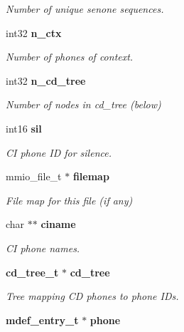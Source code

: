 \begin{DoxyCompactItemize}
\begin{DoxyCompactList}\small\item\em Number of unique senone sequences. \end{DoxyCompactList}\item 
int32 {\bf n\-\_\-ctx}\label{structbin__mdef__s_a31b5cda5136c6f72816da8889719bfe2}

\begin{DoxyCompactList}\small\item\em Number of phones of context. \end{DoxyCompactList}\item 
int32 {\bf n\-\_\-cd\-\_\-tree}\label{structbin__mdef__s_ad625c3c55d5f42ed275b8b5638a6d80b}

\begin{DoxyCompactList}\small\item\em Number of nodes in cd\-\_\-tree (below) \end{DoxyCompactList}\item 
int16 {\bf sil}\label{structbin__mdef__s_a9071b7698132c1c2ce92a6f742e1c82f}

\begin{DoxyCompactList}\small\item\em C\-I phone I\-D for silence. \end{DoxyCompactList}\item 
mmio\-\_\-file\-\_\-t $\ast$ {\bf filemap}\label{structbin__mdef__s_a3358a80c50bf3f62417596553adf9c5e}

\begin{DoxyCompactList}\small\item\em File map for this file (if any) \end{DoxyCompactList}\item 
char $\ast$$\ast$ {\bf ciname}\label{structbin__mdef__s_afdd0df913746b0656186fc8c3e8a9206}

\begin{DoxyCompactList}\small\item\em C\-I phone names. \end{DoxyCompactList}\item 
{\bf cd\-\_\-tree\-\_\-t} $\ast$ {\bf cd\-\_\-tree}\label{structbin__mdef__s_a0642be2bb56149689ad3fc1dad1e5d55}

\begin{DoxyCompactList}\small\item\em Tree mapping C\-D phones to phone I\-Ds. \end{DoxyCompactList}\item 
{\bf mdef\-\_\-entry\-\_\-t} $\ast$ {\bf phone}\label{structbin__mdef__s_a2c73ae900d198460a30bce4f641d8398}


\end{DoxyCompactItemize}
